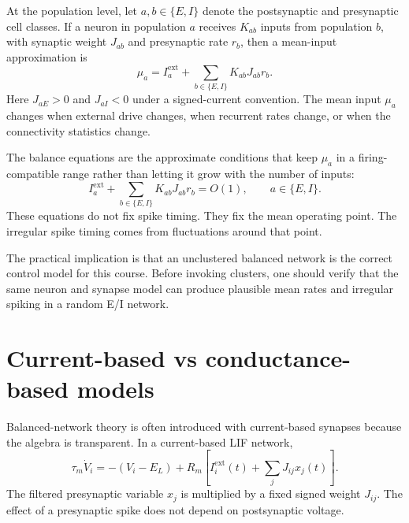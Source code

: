 \noindent At the population level, let $a,b\in\{E,I\}$ denote the postsynaptic and presynaptic cell classes. If a neuron in population $a$ receives $K_{ab}$ inputs from population $b$, with synaptic weight $J_{ab}$ and presynaptic rate $r_b$, then a mean-input approximation is
%
\begin{equation}
  \mu_a
  =
  I_a^{\mathrm{ext}}
  +
  \sum_{b\in\{E,I\}}K_{ab}J_{ab}r_b .
  \label{eq:balanced-mean-input-ch04}
\end{equation}
%
Here $J_{aE}>0$ and $J_{aI}<0$ under a signed-current convention. The mean input $\mu_a$ changes when external drive changes, when recurrent rates change, or when the connectivity statistics change.

The balance equations are the approximate conditions that keep $\mu_a$ in a firing-compatible range rather than letting it grow with the number of inputs:
%
\begin{equation}
  I_a^{\mathrm{ext}}
  +
  \sum_{b\in\{E,I\}}K_{ab}J_{ab}r_b
  =
  O(1),
  \qquad
  a\in\{E,I\}.
  \label{eq:balance-equations-ch04}
\end{equation}
%
These equations do not fix spike timing. They fix the mean operating point. The irregular spike timing comes from fluctuations around that point.

The practical implication is that an unclustered balanced network is the correct control model for this course. Before invoking clusters, one should verify that the same neuron and synapse model can produce plausible mean rates and irregular spiking in a random E/I network.

\section{Current-based vs conductance-based models}
\label{sec:current-vs-conductance-balanced}

Balanced-network theory is often introduced with current-based synapses because the algebra is transparent. In a current-based LIF network,
%
\begin{equation}
  \tau_m\dot V_i
  =
  -(V_i-E_L)
  +
  R_m\left[
    I_i^{\mathrm{ext}}(t)
    +
    \sum_j J_{ij}x_j(t)
  \right].
  \label{eq:current-based-balanced-lif}
\end{equation}
%
The filtered presynaptic variable $x_j$ is multiplied by a fixed signed weight $J_{ij}$. The effect of a presynaptic spike does not depend on postsynaptic voltage.

